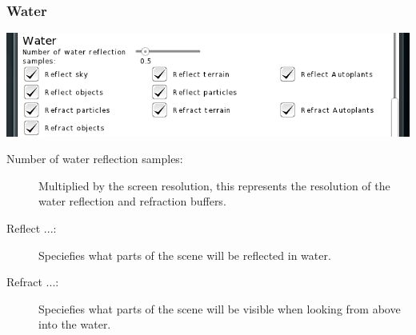 \documentclass[a4paper]{article}
\begin{document}
\subsubsection{Water}
\includegraphics[width=140mm]{./images/settings-water.png}
\begin{description}
  \item[Number of water reflection samples:] Multiplied by the screen resolution, this represents the resolution of the water reflection and refraction buffers.
  \item[Reflect ...:] Speciefies what parts of the scene will be reflected in water.
  \item[Refract ...:] Speciefies what parts of the scene will be visible when looking from above into the water.
\end{description}
\end{document}
